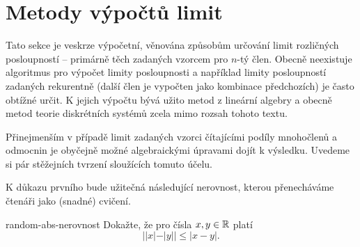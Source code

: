 \section{Metody výpočtů limit}
\label{sec:metody-vypoctu-limit}

Tato sekce je veskrze výpočetní, věnována způsobům určování limit rozličných
posloupností -- primárně těch zadaných vzorcem pro $n$-tý člen. Obecně
neexistuje algoritmus pro výpočet limity posloupnosti a například limity
posloupností zadaných rekurentně (další člen je vypočten jako kombinace
předchozích) je často obtížné určit. K jejich výpočtu bývá užito metod z
lineární algebry a obecně metod teorie diskrétních systémů zcela mimo rozsah
tohoto textu.

Přinejmenším v případě limit zadaných  vzorci čítajícími podíly
mnohočlenů a odmocnin je obyčejně možné algebraickými úpravami dojít k výsledku.
Uvedeme si pár stěžejních tvrzení sloužících tomuto účelu.

K důkazu prvního bude užitečná následující nerovnost, kterou přenecháváme
čtenáři jako (snadné) cvičení.

\begin{exercise}{}{random-abs-nerovnost}
 Dokažte, že pro čísla $x,y \in \mathbb{R}$ platí
 \[
  | |x| - |y| | \leq |x - y|.
 \]
\end{exercise}

